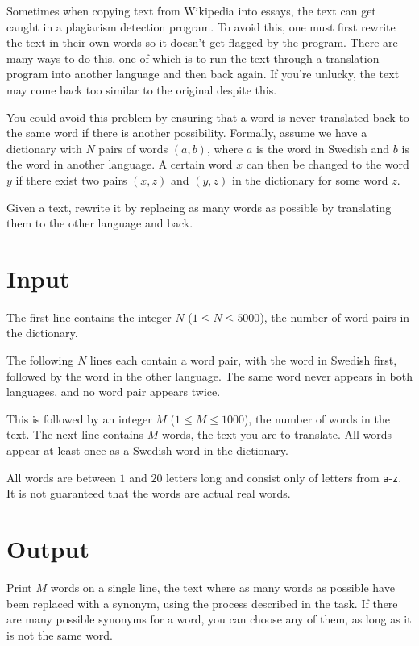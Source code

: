 Sometimes when copying text from Wikipedia into essays, the text can get caught in a plagiarism detection program.
To avoid this, one must first rewrite the text in their own words so it doesn't get flagged by the program.
There are many ways to do this, one of which is to run the text through a translation program into another
language and then back again.
If you're unlucky, the text may come back too similar to the original despite this.

You could avoid this problem by ensuring that a word is never translated back to the same word if there is another possibility.
Formally, assume we have a dictionary with $N$ pairs of words $(a, b)$, where $a$ is the word in Swedish and $b$
is the word in another language.
A certain word $x$ can then be changed to the word $y$ if there exist two pairs $(x, z)$ and $(y, z)$ in the
dictionary for some word $z$.

Given a text, rewrite it by replacing as many words as possible by translating them to the other language and back.


\section*{Input}
The first line contains the integer $N$ ($1 \le N \le 5000$), the number of word pairs in the dictionary.

The following $N$ lines each contain a word pair, with the word in Swedish first, followed by the word in the other language.
The same word never appears in both languages, and no word pair appears twice.

This is followed by an integer $M$ ($1 \le M \le 1000$), the number of words in the text.
The next line contains $M$ words, the text you are to translate.
All words appear at least once as a Swedish word in the dictionary.

All words are between $1$ and $20$ letters long and consist only of letters from \texttt{a}-\texttt{z}.
It is not guaranteed that the words are actual real words.

\section*{Output}
Print $M$ words on a single line, the text where as many words as possible have been replaced with a synonym, using
the process described in the task. If there are many possible synonyms for a word, you can choose any of them, as
long as it is not the same word.


